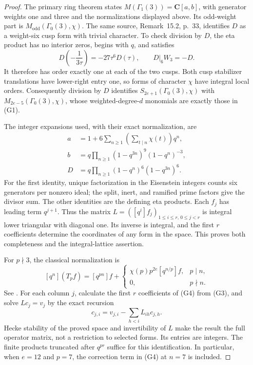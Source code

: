 \documentclass[11pt,a4paper]{article}
\theoremstyle{definition}
\begin{document}
\begin{proof}
The primary ring theorem
\cite[paragraph on $\Gamma_1(3)$, p.~12]{K17CleryVanDerGeer2022}
states $M(\Gamma_1(3))=\mathbf C[a,b]$, with generator weights one and
three and the normalizations displayed above. Its odd-weight part is
$M_{\mathrm{odd}}(\Gamma_0(3),\chi)$.
The same source, Remark~15.2, p.~33, identifies $D$ as a weight-six cusp
form with trivial character. To check division by $D$, the eta product
has no interior zeros, begins with $q$, and satisfies
\[
 D\!\left(-\frac1{3\tau}\right)=-27\tau^6D(\tau),
 \qquad D|_6W_3=-D.
\]
It therefore has order exactly one at each of the two cusps.
Both cusp stabilizer translations have lower-right entry one, so
forms of character $\chi$ have integral local orders. Consequently
division by $D$ identifies $S_{2e+1}(\Gamma_0(3),\chi)$ with
$M_{2e-5}(\Gamma_0(3),\chi)$, whose weighted-degree-$d$ monomials are
exactly those in (G1).

The integer expansions used, with their exact normalization, are
\[
\begin{aligned}
 a&=1+6\sum_{n\ge1}\left(\sum_{t\mid n}\chi(t)\right)q^n,\\
 b&=q\prod_{n\ge1}(1-q^{3n})^9(1-q^n)^{-3},\\
 D&=q\prod_{n\ge1}(1-q^n)^6(1-q^{3n})^6.
\end{aligned}
 \tag{G3}
\]
For the first identity, unique factorization in the Eisenstein integers
counts six generators per nonzero ideal; the split, inert, and ramified
prime factors give the divisor sum. The other identities are the
defining eta products. Each $f_j$ has leading term $q^{j+1}$.
Thus the matrix
$L=([q^i]f_j)_{1\le i\le r,\,0\le j<r}$ is integral lower triangular
with diagonal one. Its inverse is integral, and the first $r$
coefficients determine the coordinates of any form in the space.
This proves both completeness and the integral-lattice assertion.

For $p\nmid3$, the classical normalization is
\[
 [q^n](T_pf)=[q^{pn}]f+
 \begin{cases}
 \chi(p)p^{2e}[q^{n/p}]f,&p\mid n,\\
 0,&p\nmid n.
 \end{cases}
 \tag{G4}
\]
See \cite[\S8.2.2, p.~66]{K17RibetStein2011}.
For each column $j$, calculate the first $r$ coefficients of (G4)
from (G3), and solve $Lc_j=v_j$ by the exact recursion
\[
 c_{j,i}=v_{j,i}-\sum_{h<i}L_{ih}c_{j,h}.
 \tag{G5}
\]
Hecke stability of the proved space and invertibility of $L$ make the
result the full operator matrix, not a restriction to selected forms.
Its entries are integers. The finite products truncated after
$q^{pr}$ suffice for this identification. In particular, when $e=12$
and $p=7$, the correction term in (G4) at $n=7$ is included.


\end{proof}
\end{document}
